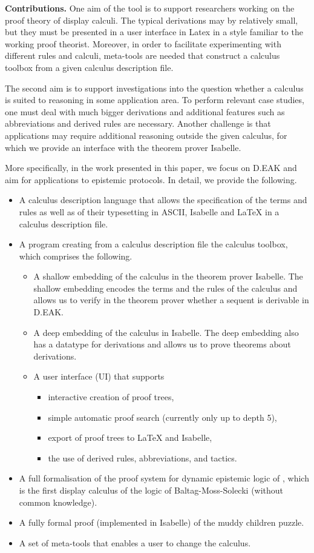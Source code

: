 \documentclass[runningheads,a4paper]{llncs}
\begin{document}
\medskip\noindent\textbf{Contributions. }
One aim of the tool is to support researchers working on the proof theory of display calculi. The typical derivations may by relatively small, but they must be presented in a user interface in Latex in a style familiar to the working proof theorist. Moreover, in order to facilitate experimenting with different rules and calculi, meta-tools are needed that construct a calculus toolbox from a  given calculus description file.

The second aim is to support investigations into the question whether a calculus is suited to reasoning in some application area. To perform relevant case studies, one must deal with much bigger derivations and additional features such as abbreviations and derived rules are necessary. Another challenge is that applications may require additional reasoning outside the given calculus, for which we provide an interface with the theorem prover Isabelle.  

More specifically, in the work presented in this paper, we focus on D.EAK and aim for applications to epistemic protocols. In detail, we provide the following.


\begin{itemize}
\item A calculus description language that allows the specification of the  terms and rules as well as of their typesetting in ASCII, Isabelle and LaTeX in a calculus description file.
\item A program creating from a calculus description file the calculus toolbox, which comprises the following.
\begin{itemize}
\item A shallow embedding of the calculus in the theorem prover Isabelle. The shallow embedding encodes the terms and the rules of the calculus and allows us to verify in the theorem prover whether a sequent is derivable in D.EAK.
\item A deep embedding of the calculus in Isabelle. The deep embedding also has a datatype for derivations and allows us to prove theorems about derivations. 
\item A user interface (UI) that supports
\begin{itemize}
\item interactive creation of proof trees,
\item simple automatic proof search (currently only up to depth 5),
\item export of proof trees to LaTeX and Isabelle,
\item the use of derived rules, abbreviations, and tactics.
\end{itemize}
\end{itemize}
\item A full formalisation of the proof system for dynamic epistemic logic of \cite{DEAK}, which is the first display calculus of the logic of Baltag-Moss-Solecki \cite{bms} (without common knowledge).
\item A fully formal proof (implemented in Isabelle) of the muddy children puzzle.
\item A set of meta-tools that enables a user to change the calculus.
\end{itemize}
\end{document}
